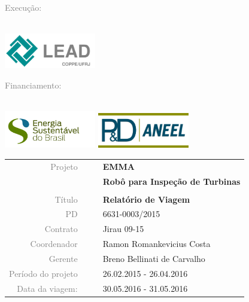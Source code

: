 \thispagestyle{empty}


\hypersetup{pageanchor=false}

\vspace{4cm}

 \textcolor{gray}{Execução:} \\
\\
\begin{minipage}{\textwidth}
	\centering
       
	\includegraphics[width=0.3\textwidth]{logos/lead-logo}
	
\end{minipage}

\vspace{2cm}

\textcolor{gray}{Financiamento: } \\ 
\\
\begin{minipage}{\textwidth}
	\centering
	
	\includegraphics[width=0.3\textwidth]{logos/esbr-logo}
	\includegraphics[width=0.3\textwidth]{logos/aneel-logo}

	
\end{minipage}

\vspace{4cm}

\begin{table}[ht!]
	\centering
	\begin{tabular}{r l|l p{12cm} }
		\textcolor{gray}{Projeto} &&& \textbf{\Large EMMA}\\
			&&& \textbf{Robô para Inspeção de Turbinas}\\
			&&& \\
		\textcolor{gray}{Título} &&& \textbf{Relatório de Viagem}\\
		\textcolor{gray}{PD} &&& 6631-0003/2015 \\
		\textcolor{gray}{Contrato} &&& Jirau 09-15\\
		\textcolor{gray}{Coordenador} &&& Ramon Romankevicius Costa \\
		\textcolor{gray}{Gerente} &&& Breno Bellinati de Carvalho \\
		\textcolor{gray}{Período do projeto} &&& 26.02.2015 - 26.04.2016 \\
		\textcolor{gray}{Data da viagem:} &&& 30.05.2016 - 31.05.2016 \\
	\end{tabular}
\end{table}


